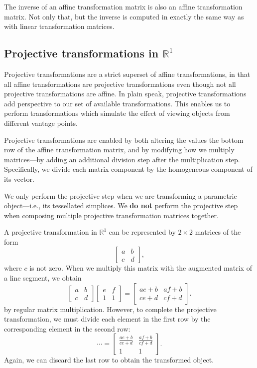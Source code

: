 The inverse of an affine transformation matrix is also an affine
transformation matrix. Not only that, but the inverse is computed in 
exactly the same way as with linear transformation matrices.

\subsection{Projective transformations in \texorpdfstring{\(\mathbb{R}^{1}\)}{R1}}

Projective transformations are a strict superset of affine
transformations, in that all affine transformations are projective
transformations even though not all projective transformations are
affine. In plain speak, projective transformations add perspective
to our set of available transformations. This enables us to perform
transformations which simulate the effect of viewing objects from
different vantage points.

Projective transformations are enabled by both altering the values the 
bottom row of the affine transformation matrix, and by modifying how we
multiply matrices---by adding an additional division step after the
multiplication step. Specifically, we divide each matrix component by 
the homogeneous component of its vector.
\begin{remark}
    We only perform the projective step when we are transforming 
    a parametric object---i.e., its tessellated simplices. We 
    \textbf{do not} perform the projective step when composing 
    multiple projective transformation matrices together.
\end{remark}

A projective transformation in \(\mathbb{R}^{1}\) can be represented
by \(2\times2\) matrices of the form
\[
    \begin{bmatrix}
        a & b \\
        c & d 
    \end{bmatrix},
\]
where \(c\) is not zero. When we multiply this matrix with the
augmented matrix of a line segment, we obtain
\[
    \begin{bmatrix}
        a & b \\
        c & d 
    \end{bmatrix}
    \begin{bmatrix}
        e & f \\
        1 & 1
    \end{bmatrix}
    =
    \begin{bmatrix}
        ae + b & af + b \\
        ce + d & cf + d
    \end{bmatrix}.
\]
by regular matrix multiplication. However, to complete the projective
transformation, we must divide each element in the first row by the
corresponding element in the second row:
\[
    \cdots=
    \begin{bmatrix}
        \frac{ae + b}{ce + d} & \frac{af + b}{cf + d} \\
        1 & 1
    \end{bmatrix}.
\]
Again, we can discard the last row to obtain the transformed object.

